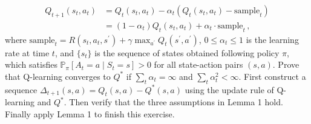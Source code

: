 \documentclass{article}
\begin{document}
\begin{enumerate}
\begin{enumerate}
    \begin{align*}
        Q_{t+1}(s_t,a_t)&=Q_t(s_t,a_t)-\alpha_t(Q_t(s_t,a_t)-\text{sample}_t)\\
        &=(1-\alpha_t)Q_t(s_t,a_t)+\alpha_t\cdot\text{sample}_t\,,
    \end{align*}
    where $\text{sample}_t=R(s_t,a_t,s^\prime)+\gamma\max_{a^\prime}Q_{t}(s^\prime,a^\prime)$, $0\leq \alpha_t\leq 1$ is the learning rate at time $t$, and $\{s_t\}$ is the sequence of states obtained
    following policy $\pi$, which satisfies 
    $\mathbb{P}_{\pi}\left[A_{t}=a \mid S_{t}=s\right]>0$ for all
    state-action pairs $(s,a)$. Prove that Q-learning converges to $Q^\ast$ if $\sum_{t} \alpha_{t}=\infty$ and $\sum_{t} \alpha^2_{t}<\infty$. First construct a sequence $\Delta_{t+1}(s,a)=Q_t(s,a)-Q^\ast(s,a)$ using the update rule of Q-learning and $Q^\ast$. Then verify that the three assumptions in Lemma 1 hold. Finally apply Lemma 1 to finish this exercise. 
    

\end{enumerate}
\end{enumerate}
\end{document}
